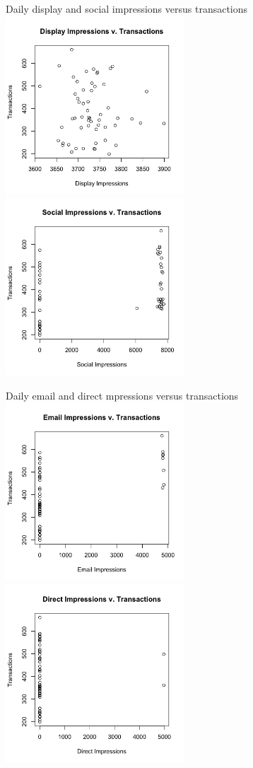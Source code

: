 \documentclass[10pt, aspectratio=169]{beamer}
\begin{document}
\begin{frame}{Daily display and social impressions versus transactions}
\includegraphics[width=0.5\textwidth]{images/mixmodeldisplavtrans.png}
\includegraphics[width=0.5\textwidth]{images/mixmodelsocialvtrans.png}
\end{frame}

\begin{frame}{Daily email and direct mpressions versus transactions}
\includegraphics[width=0.5\textwidth]{images/mixmodelemailvtrans.png}
\includegraphics[width=0.5\textwidth]{images/mixmodeldirectvtrans.png}
\end{frame}
\end{document}
